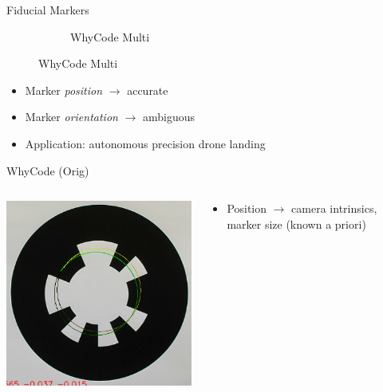 \documentclass[aspectratio=169]{beamer}
\newif\ifpause
\newcommand{\mypause}{\ifpause \pause \fi}
\begin{document}
\begin{frame}{Fiducial Markers}
\begin{figure}[]
\begin{subfigure}[b]{0.23\linewidth}
		    \caption{WhyCode Multi~\cite{fiducial_precursor_evaluation}}
		\label{figure:whycode_bundle}
	    \end{subfigure}
	    \label{figure:marker_setup}
	\end{figure}
	\mypause
	\begin{itemize}
		\item Marker \emph{position} $\rightarrow$ accurate
		\item Marker \emph{orientation} $\rightarrow$ ambiguous
		\item Application: autonomous precision drone landing
	\end{itemize}
	\vspace*{\fill}
\end{frame}

\begin{frame}{WhyCode (Orig)}
	\begin{columns}
	\begin{column}{0.4\textwidth}
		\centering
		\includegraphics[width=\linewidth]{./images/whycode_orig_both_solutions_cropped.png}
	\end{column}
	\begin{column}{0.6\textwidth}
	\begin{itemize}
		\item Position $\rightarrow$ camera intrinsics, marker size (known a priori)\mypause

\end{itemize}
\end{column}
\end{columns}
\end{frame}
\end{document}
